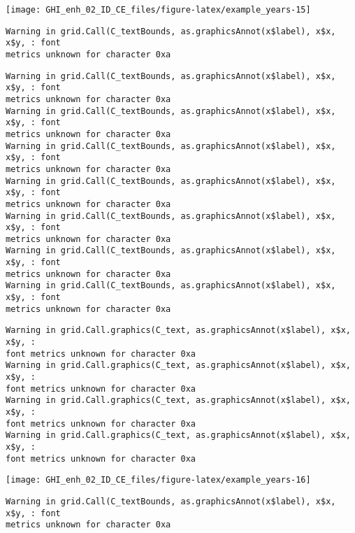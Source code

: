\documentclass[
  10pt,
  a4paper,oneside]{article}
\begin{document}
\begin{center}\texttt{[image: GHI\_enh\_02\_ID\_CE\_files/figure-latex/example\_years-15]} \end{center}

\begin{verbatim}
Warning in grid.Call(C_textBounds, as.graphicsAnnot(x$label), x$x, x$y, : font
metrics unknown for character 0xa
\end{verbatim}

\begin{verbatim}
Warning in grid.Call(C_textBounds, as.graphicsAnnot(x$label), x$x, x$y, : font
metrics unknown for character 0xa
Warning in grid.Call(C_textBounds, as.graphicsAnnot(x$label), x$x, x$y, : font
metrics unknown for character 0xa
Warning in grid.Call(C_textBounds, as.graphicsAnnot(x$label), x$x, x$y, : font
metrics unknown for character 0xa
Warning in grid.Call(C_textBounds, as.graphicsAnnot(x$label), x$x, x$y, : font
metrics unknown for character 0xa
Warning in grid.Call(C_textBounds, as.graphicsAnnot(x$label), x$x, x$y, : font
metrics unknown for character 0xa
Warning in grid.Call(C_textBounds, as.graphicsAnnot(x$label), x$x, x$y, : font
metrics unknown for character 0xa
Warning in grid.Call(C_textBounds, as.graphicsAnnot(x$label), x$x, x$y, : font
metrics unknown for character 0xa
\end{verbatim}

\begin{verbatim}
Warning in grid.Call.graphics(C_text, as.graphicsAnnot(x$label), x$x, x$y, :
font metrics unknown for character 0xa
Warning in grid.Call.graphics(C_text, as.graphicsAnnot(x$label), x$x, x$y, :
font metrics unknown for character 0xa
Warning in grid.Call.graphics(C_text, as.graphicsAnnot(x$label), x$x, x$y, :
font metrics unknown for character 0xa
Warning in grid.Call.graphics(C_text, as.graphicsAnnot(x$label), x$x, x$y, :
font metrics unknown for character 0xa
\end{verbatim}

\begin{center}\texttt{[image: GHI\_enh\_02\_ID\_CE\_files/figure-latex/example\_years-16]} \end{center}

\begin{verbatim}
Warning in grid.Call(C_textBounds, as.graphicsAnnot(x$label), x$x, x$y, : font
metrics unknown for character 0xa
\end{verbatim}
\end{document}
